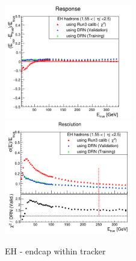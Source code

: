 \begin{figure}                                                                                                                                                                   
\includegraphics[width=0.495\textwidth]{./plots_pdf/HCAL_plots/Trained_target_ratioflip_0_500_10/pdf/EH_ec_in/EC_within_tracker_corrEtaEndcapEcalHcal.png}
\includegraphics[width=0.495\textwidth]{./plots_pdf/HCAL_plots/Trained_target_ratioflip_0_500_10/pdf/EH_ec_in/EC_within_tracker_corrEtaEndcapEcalHcal_reso.png}
\caption{EH - endcap within tracker}
\end{figure}


